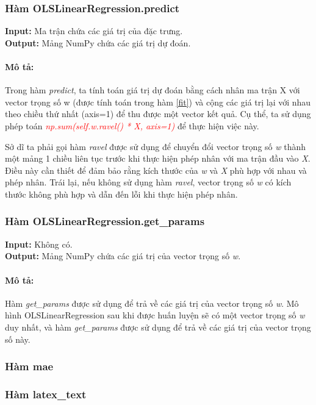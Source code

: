 \documentclass[]{article}
\begin{document}
\subsubsection{Hàm OLSLinearRegression.predict}
\noindent
\textbf{Input:} Ma trận chứa các giá trị của đặc trưng. \\
\textbf{Output:} Mảng NumPy chứa các giá trị dự đoán.
\paragraph{Mô tả:} 
Trong hàm \textit{predict}, ta tính toán giá trị dự đoán bằng cách nhân ma trận X với vector trọng số w (được tính toán trong hàm \ref{fit}) và cộng các giá trị lại với nhau theo chiều thứ nhất (axis=1) để thu được một vector kết quả. Cụ thể, ta sử dụng phép toán \textcolor{red}{\textit{np.sum(self.w.ravel() * X, axis=1)}} để thực hiện việc này.

Sở dĩ ta phải gọi hàm \textit{ravel} được sử dụng để chuyển đổi vector trọng số \textit{w} thành một mảng 1 chiều liên tục trước khi thực hiện phép nhân với ma trận đầu vào \textit{X}. Điều này cần thiết để đảm bảo rằng kích thước của \textit{w} và \textit{X} phù hợp với nhau và phép nhân. Trái lại, nếu không sử dụng hàm \textit{ravel}, vector trọng số \textit{w} có kích thước không phù hợp và dẫn đến lỗi khi thực hiện phép nhân.

\subsubsection{Hàm OLSLinearRegression.get\_params}
\noindent
\textbf{Input:} Không có. \\
\textbf{Output:} Mảng NumPy chứa các giá trị của vector trọng số \textit{w}.
\paragraph{Mô tả:}

Hàm \textit{get\_params} được sử dụng để trả về các giá trị của vector trọng số \textit{w}. Mô hình OLSLinearRegression sau khi được huấn luyện sẽ có một vector trọng số \textit{w} duy nhất, và hàm \textit{get\_params} được sử dụng để trả về các giá trị của vector trọng số này.

\subsubsection{Hàm mae} \label{mae}
\subsubsection{Hàm latex\_text}
\end{document}
